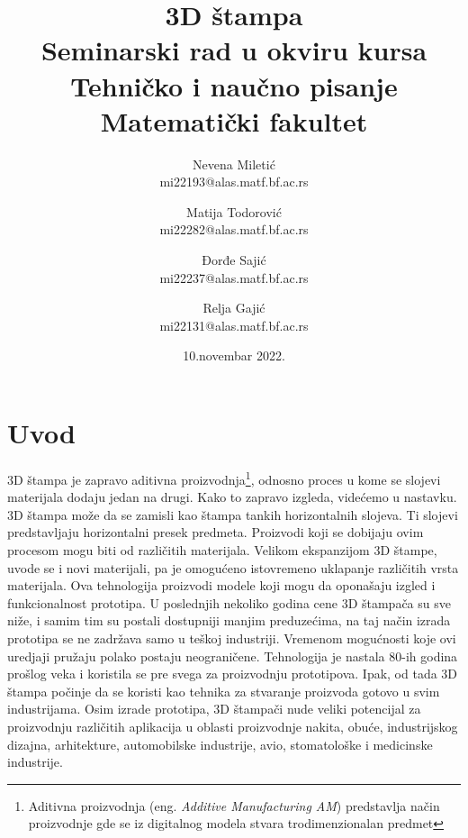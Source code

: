 \documentclass[a4paper]{article}
\begin{document}
\title{3D štampa\\ \small{Seminarski rad u okviru kursa\\Tehničko i naučno pisanje\\ Matematički fakultet}}


\author{    Nevena Miletić\\ mi22193@alas.matf.bf.ac.rs
        \and Matija Todorović\\ mi22282@alas.matf.bf.ac.rs
        \and Đorđe Sajić\\ mi22237@alas.matf.bf.ac.rs
        \and Relja Gajić\\ mi22131@alas.matf.bf.ac.rs
 }

\date{10.novembar 2022.}
\maketitle
{}
\tableofcontents

\newpage

\section{Uvod\cite{b}}
\label{sec:uvod}
3D štampa je zapravo aditivna proizvodnja\footnote{Aditivna proizvodnja (eng. \emph{
Additive Manufacturing AM}) predstavlja način proizvodnje gde se iz digitalnog modela
stvara trodimenzionalan predmet}, odnosno proces u kome se slojevi materijala dodaju
jedan na drugi. Kako to zapravo izgleda, videćemo u nastavku.
\bigbreak
3D štampa može da se zamisli kao štampa tankih horizontalnih slojeva. Ti slojevi
predstavljaju horizontalni presek predmeta. Proizvodi koji se dobijaju ovim procesom
mogu biti od različitih materijala. Velikom ekspanzijom 3D štampe, uvode se i novi
materijali, pa je omogućeno istovremeno uklapanje različitih vrsta materijala. Ova
tehnologija proizvodi modele koji mogu da oponašaju izgled i funkcionalnost prototipa.
U poslednjih nekoliko godina cene 3D štampača su sve niže, i samim tim su postali
dostupniji manjim preduzećima, na taj način izrada prototipa se ne zadržava samo u
teškoj industriji. Vremenom mogućnosti koje ovi uredjaji pružaju polako postaju
neograničene.
\bigbreak Tehnologija je nastala 80-ih godina prošlog veka i koristila se pre svega za
proizvodnju prototipova. Ipak, od tada 3D štampa počinje da se koristi kao tehnika za
stvaranje proizvoda gotovo u svim industrijama. Osim izrade prototipa, 3D štampači
nude veliki potencijal za proizvodnju različitih aplikacija u oblasti proizvodnje nakita,
obuće, industrijskog dizajna, arhitekture, automobilske industrije, avio, stomatološke i
medicinske industrije.
\end{document}
